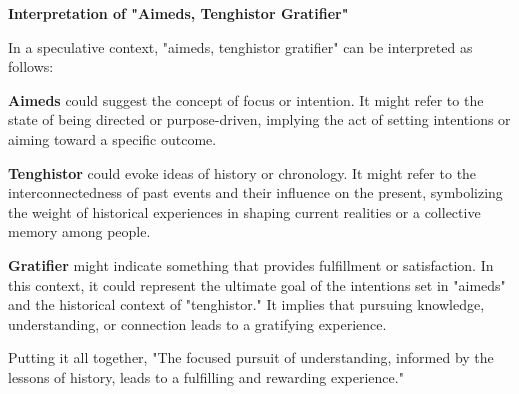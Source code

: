 \documentclass{article}
\begin{document}
\begin{center}
{\bf Interpretation of "Aimeds, Tenghistor Gratifier"}
\end{center}

In a speculative context, "aimeds, tenghistor gratifier" can be interpreted as follows:

{\bf Aimeds} could suggest the concept of focus or intention. It might refer to the state of being directed or purpose-driven, implying the act of setting intentions or aiming toward a specific outcome.

{\bf Tenghistor} could evoke ideas of history or chronology. It might refer to the interconnectedness of past events and their influence on the present, symbolizing the weight of historical experiences in shaping current realities or a collective memory among people.

{\bf Gratifier} might indicate something that provides fulfillment or satisfaction. In this context, it could represent the ultimate goal of the intentions set in "aimeds" and the historical context of "tenghistor." It implies that pursuing knowledge, understanding, or connection leads to a gratifying experience.

Putting it all together, "The focused pursuit of understanding, informed by the lessons of history, leads to a fulfilling and rewarding experience."
\end{document}
